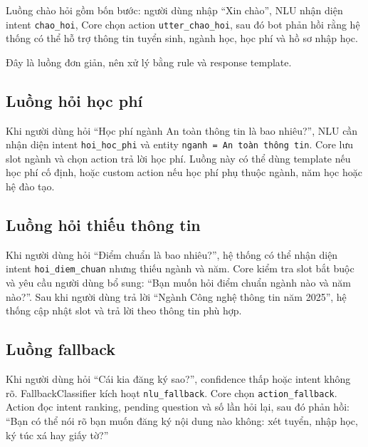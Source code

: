 Luồng chào hỏi gồm bốn bước: người dùng nhập ``Xin chào'', NLU nhận diện intent \texttt{chao\_hoi}, Core chọn action \texttt{utter\_chao\_hoi}, sau đó bot phản hồi rằng hệ thống có thể hỗ trợ thông tin tuyển sinh, ngành học, học phí và hồ sơ nhập học.

Đây là luồng đơn giản, nên xử lý bằng rule và response template.

\subsection*{Luồng hỏi học phí}

Khi người dùng hỏi ``Học phí ngành An toàn thông tin là bao nhiêu?'', NLU cần nhận diện intent \texttt{hoi\_hoc\_phi} và entity \texttt{nganh = An toàn thông tin}. Core lưu slot ngành và chọn action trả lời học phí. Luồng này có thể dùng template nếu học phí cố định, hoặc custom action nếu học phí phụ thuộc ngành, năm học hoặc hệ đào tạo.

\subsection*{Luồng hỏi thiếu thông tin}

Khi người dùng hỏi ``Điểm chuẩn là bao nhiêu?'', hệ thống có thể nhận diện intent \texttt{hoi\_diem\_chuan} nhưng thiếu ngành và năm. Core kiểm tra slot bắt buộc và yêu cầu người dùng bổ sung: ``Bạn muốn hỏi điểm chuẩn ngành nào và năm nào?''. Sau khi người dùng trả lời ``Ngành Công nghệ thông tin năm 2025'', hệ thống cập nhật slot và trả lời theo thông tin phù hợp.

\subsection*{Luồng fallback}

Khi người dùng hỏi ``Cái kia đăng ký sao?'', confidence thấp hoặc intent không rõ. FallbackClassifier kích hoạt \texttt{nlu\_fallback}. Core chọn \texttt{action\_fallback}. Action đọc intent ranking, pending question và số lần hỏi lại, sau đó phản hồi: ``Bạn có thể nói rõ bạn muốn đăng ký nội dung nào không: xét tuyển, nhập học, ký túc xá hay giấy tờ?''

